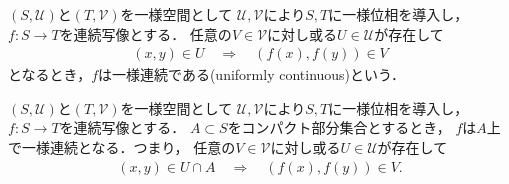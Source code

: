 	\begin{screen}
		\begin{dfn}[一様連続性]
			$(S,\mathscr{U})$と$(T,\mathscr{V})$を一様空間として
			$\mathscr{U},\mathscr{V}$により$S,T$に一様位相を導入し，
			$f:S \longrightarrow T$を連続写像とする．
			任意の$V \in \mathscr{V}$に対し或る$U \in \mathscr{U}$が存在して
			\begin{align}
				(x,y) \in U \quad \Longrightarrow \quad (f(x),f(y)) \in V
			\end{align}
			となるとき，$f$は一様連続である(uniformly continuous)という．
		\end{dfn}
	\end{screen}
	
	\begin{screen}
		\begin{thm}[コンパクト集合上で連続写像は一様連続]
			$(S,\mathscr{U})$と$(T,\mathscr{V})$を一様空間として
			$\mathscr{U},\mathscr{V}$により$S,T$に一様位相を導入し，
			$f:S \longrightarrow T$を連続写像とする．
			$A \subset S$をコンパクト部分集合とするとき，
			$f$は$A$上で一様連続となる．つまり，
			任意の$V \in \mathscr{V}$に対し或る$U \in \mathscr{U}$が存在して
			\begin{align}
				(x,y) \in U \cap A \quad \Longrightarrow \quad (f(x),f(y)) \in V.
			\end{align}
		\end{thm}
	\end{screen}
	

